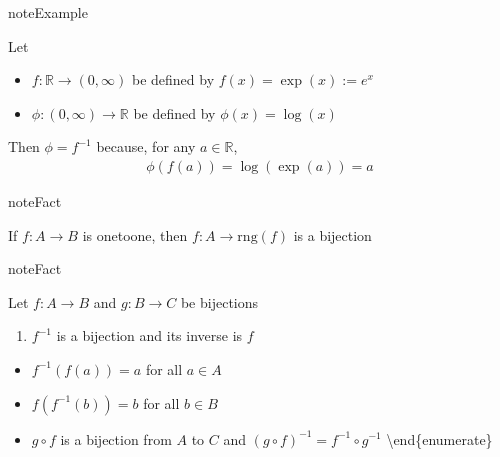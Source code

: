 \documentclass[letterpaper,10pt,english]{jupyterBook}
\begin{document}
\begin{figure}[htbp]
\centering

\noindent{}
\end{figure}

\begin{sphinxadmonition}{note}{Example}

\sphinxAtStartPar
Let
\begin{itemize}
\item {} 
\sphinxAtStartPar
\(f \colon \mathbb{R} \to (0, \infty)\) be defined by \(f(x) = \exp(x) :=
e^x\)

\item {} 
\sphinxAtStartPar
\(\phi \colon (0, \infty) \to \mathbb{R}\) be defined by \(\phi(x) = \log(x)\)

\end{itemize}

\sphinxAtStartPar
Then \(\phi = f^{-1}\) because, for any \(a \in \mathbb{R}\),
\begin{equation*}
\begin{split}
\phi(f(a)) = \log(\exp(a)) = a
\end{split}
\end{equation*}\end{sphinxadmonition}

\begin{sphinxadmonition}{note}{Fact}

\sphinxAtStartPar
If \(f \colon A \to B\) is one\sphinxhyphen{}to\sphinxhyphen{}one, then \(f \colon A \to \mathrm{rng}(f)\) is a bijection
\end{sphinxadmonition}

\begin{sphinxadmonition}{note}{Fact}

\sphinxAtStartPar
Let \(f \colon A \to B\) and \(g \colon B \to C\) be bijections
\begin{enumerate}
%
\item {} 
\sphinxAtStartPar
\(f^{-1}\) is a bijection and its inverse is \(f\)

\end{enumerate}
\begin{itemize}
\item {} 
\sphinxAtStartPar
\(f^{-1}(f(a)) = a\) for all \(a \in A\)

\item {} 
\sphinxAtStartPar
\(f(f^{-1}(b)) = b\) for all \(b \in B\)

\item {} 
\sphinxAtStartPar
\(g \circ f\) is a bijection from \(A\) to \(C\) and \((g \circ f)^{-1}
= f^{-1} \circ g^{-1}\)
\textbackslash{}end\{enumerate\}

\end{itemize}
\end{sphinxadmonition}
\end{document}

